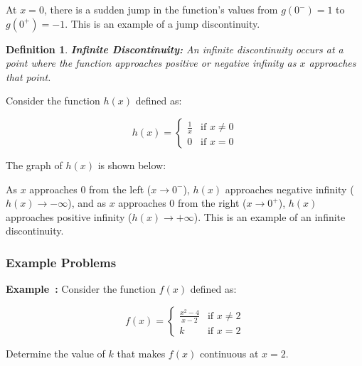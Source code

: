 \documentclass[a4paper,12pt]{book}
\newcounter{example}
\newenvironment{example}[1][\theexample]
  {\refstepcounter{example}\par\medskip\noindent\textbf{Example~#1:} \rmfamily}
  {\medskip}
\newtheorem{definition}{Definition}
\begin{document}
At \(x = 0\), there is a sudden jump in the function's values from \(g(0^-) = 1\) to \(g(0^+) = -1\). This is an example of a jump discontinuity.

\begin{definition}
\textbf{Infinite Discontinuity:} An infinite discontinuity occurs at a point where the function approaches positive or negative infinity as \(x\) approaches that point.
\end{definition}

Consider the function \(h(x)\) defined as:

\[
h(x) =
\begin{cases}
  \frac{1}{x} & \text{if } x \neq 0 \\
  0 & \text{if } x = 0
\end{cases}
\]

The graph of \(h(x)\) is shown below:

\begin{center}
\end{center}


As \(x\) approaches 0 from the left (\(x \to 0^-\)), \(h(x)\) approaches negative infinity (\(h(x) \to -\infty\)), and as \(x\) approaches 0 from the right (\(x \to 0^+\)), \(h(x)\) approaches positive infinity (\(h(x) \to +\infty\)). This is an example of an infinite discontinuity.

\subsubsection*{Example Problems}

\begin{example}
Consider the function \(f(x)\) defined as:

\[
f(x) =
\begin{cases}
  \frac{x^2 - 4}{x - 2} & \text{if } x \neq 2 \\
  k & \text{if } x = 2
\end{cases}
\]

Determine the value of \(k\) that makes \(f(x)\) continuous at \(x = 2\).
\end{example}
\end{document}
